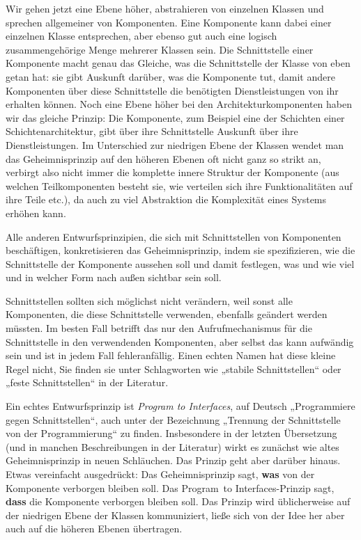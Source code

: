 Wir gehen jetzt eine Ebene höher, abstrahieren von einzelnen Klassen und sprechen allgemeiner von Komponenten. Eine Komponente kann dabei einer einzelnen Klasse entsprechen, aber ebenso gut auch eine logisch zusammengehörige Menge mehrerer Klassen sein. Die Schnittstelle einer Komponente macht genau das Gleiche, was die Schnittstelle der Klasse von eben getan hat: sie gibt Auskunft darüber, was die Komponente tut, damit andere Komponenten über diese Schnittstelle die benötigten Dienstleistungen von ihr erhalten können. Noch eine Ebene höher bei den Architektur\-komponenten haben wir das gleiche Prinzip: Die Komponente, zum Beispiel eine der Schichten einer Schichtenarchitektur, gibt über ihre Schnittstelle Auskunft über ihre Dienstleistungen. Im Unterschied zur niedrigen Ebene der Klassen wendet man das Geheimnisprinzip auf den höheren Ebenen oft nicht ganz so strikt an, verbirgt also nicht immer die komplette innere Struktur der Komponente (aus welchen Teilkomponenten besteht sie, wie verteilen sich ihre Funktionalitäten auf ihre Teile etc.), da auch zu viel Abstraktion die Komplexität eines Systems erhöhen kann. 

\vspace{-0.1mm} %

Alle anderen Entwurfsprinzipien, die sich mit Schnittstellen von Komponenten beschäftigen, konkretisieren das Geheimnisprinzip, indem sie spezifizieren, wie die Schnittstelle der Komponente aussehen soll und damit festlegen, was und wie viel und in welcher Form nach außen sichtbar sein soll. 

\vspace{-0.1mm} %

Schnittstellen sollten sich möglichst nicht verändern, weil sonst alle Komponenten, die diese Schnittstelle verwenden, ebenfalls geändert werden müssten. Im besten Fall betrifft das nur den Aufrufmechanismus für die Schnittstelle in den verwendenden Komponenten, aber selbst das kann aufwändig sein und ist in jedem Fall fehleranfällig.  Einen echten Namen hat diese kleine Regel nicht, Sie finden sie unter Schlagworten wie „stabile Schnittstellen“ oder „feste Schnittstellen“ in der Literatur.

\vspace{-0.1mm} %

Ein echtes Entwurfsprinzip ist \textit{Program to Interfaces}, 
auf Deutsch „Programmiere gegen Schnittstellen“, auch unter der Bezeichnung „Trennung der Schnittstelle von der Programmierung“ zu finden. Insbesondere in der letzten Übersetzung (und in manchen Beschreibungen in der Literatur) wirkt es zunächst wie altes Geheimnisprinzip in neuen Schläuchen. Das Prinzip geht aber darüber hinaus. Etwas vereinfacht ausgedrückt: Das Geheimnisprinzip sagt, \textbf{was} von der Komponente verborgen bleiben soll. Das Program~to Interfaces-Prinzip sagt, \textbf{dass} die Komponente verborgen bleiben soll. Das Prinzip wird üblicherweise auf der niedrigen Ebene der Klassen kommuniziert, ließe sich von der Idee her aber auch auf die höheren Ebenen übertragen. 

